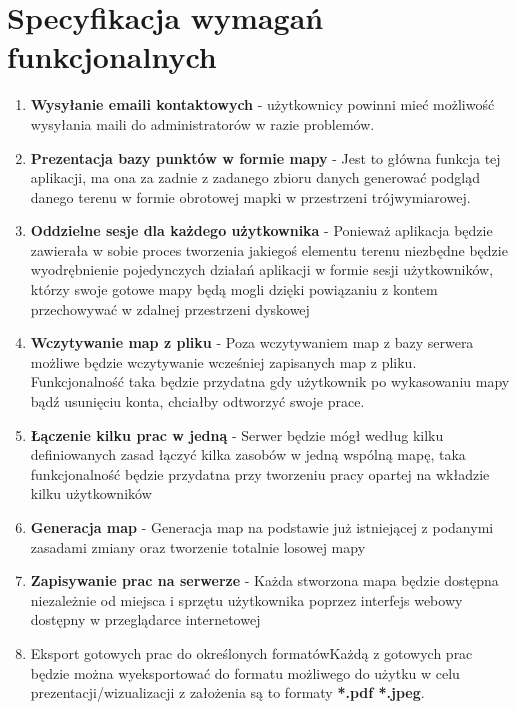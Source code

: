 \section{Specyfikacja wymagań funkcjonalnych}
\begin{enumerate}
  \item \textbf{Wysyłanie emaili kontaktowych} - użytkownicy powinni mieć możliwość wysyłania maili do administratorów w razie problemów.

  \item \textbf{Prezentacja bazy punktów w formie mapy} - Jest to główna funkcja tej aplikacji, ma ona za zadnie z zadanego zbioru danych generować podgląd danego terenu w formie obrotowej mapki w przestrzeni trójwymiarowej.

  \item \textbf{Oddzielne sesje dla każdego użytkownika} - Ponieważ aplikacja będzie zawierała w sobie proces tworzenia jakiegoś elementu terenu niezbędne będzie wyodrębnienie pojedynczych działań aplikacji w formie sesji użytkowników, którzy swoje gotowe mapy będą mogli dzięki powiązaniu z kontem przechowywać w zdalnej przestrzeni dyskowej
  
  \item \textbf{Wczytywanie map z pliku} - Poza wczytywaniem map z bazy serwera możliwe będzie wczytywanie wcześniej zapisanych map z pliku. Funkcjonalność taka będzie przydatna gdy użytkownik po wykasowaniu mapy bądź usunięciu konta, chciałby odtworzyć swoje prace.
  
  \item \textbf{Łączenie kilku prac w jedną} - Serwer będzie mógł według kilku definiowanych zasad łączyć kilka zasobów w jedną wspólną mapę, taka funkcjonalność będzie przydatna przy tworzeniu pracy opartej na wkładzie kilku użytkowników
  
  \item \textbf{Generacja map} - Generacja map na podstawie już istniejącej z podanymi zasadami zmiany oraz tworzenie totalnie losowej mapy
  
  \item \textbf{Zapisywanie prac na serwerze} - Każda stworzona mapa będzie dostępna niezależnie od miejsca i sprzętu użytkownika poprzez interfejs webowy dostępny w przeglądarce internetowej
  
  \item{Eksport gotowych prac do określonych formatów}{Każdą z gotowych prac będzie można wyeksportować do formatu możliwego do użytku w celu prezentacji/wizualizacji z założenia są to formaty \textbf{*.pdf *.jpeg}.}
\end{enumerate}

